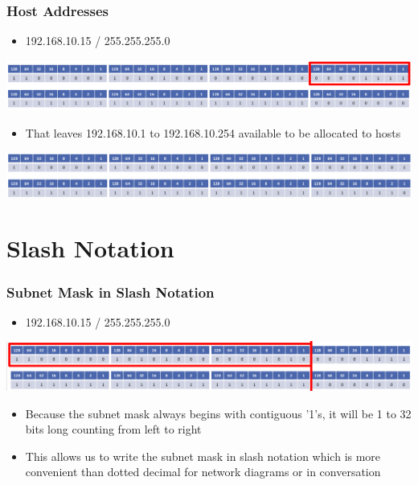 \documentclass[pdflatex,compress]{beamer}
\begin{document}
\begin{frame}
	\frametitle{Host Addresses}
	\begin{itemize}
		\item 192.168.10.15 / 255.255.255.0
	\end{itemize}
	\begin{center}
		\includegraphics[width=\linewidth]{img/img33}
	\end{center}
	\begin{itemize}
		\item That leaves 192.168.10.1 to 192.168.10.254 available to be allocated to hosts
	\end{itemize}
	\begin{center}
		\includegraphics[width=\linewidth]{img/img34}
	\end{center}
\end{frame}

\section{Slash Notation}

\begin{frame}
	\frametitle{Subnet Mask in Slash Notation}
	\begin{itemize}
		\item 192.168.10.15 / 255.255.255.0
	\end{itemize}
	\begin{center}
		\includegraphics[width=\linewidth]{img/img35}
	\end{center}
	\begin{itemize}
		\item Because the subnet mask always begins with contiguous '1's, it will be 1 to 32 bits long counting from left to right
		\item This allows us to write the subnet mask in slash notation which is more convenient than dotted decimal for network diagrams or in conversation
	\end{itemize}
\end{frame}
\end{document}
